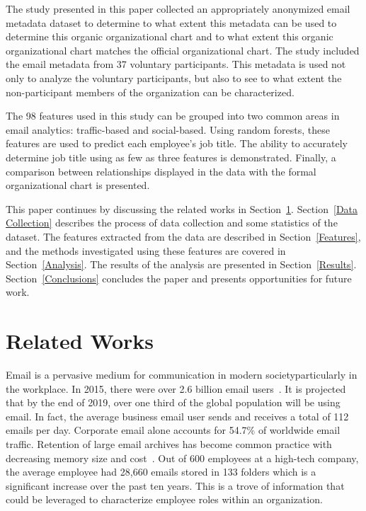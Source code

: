 \documentclass{article}
\begin{document}
The study presented in this paper collected an appropriately anonymized email metadata dataset to determine to what extent this metadata can be used to determine this organic organizational chart and to what extent this organic organizational chart matches the official organizational chart.  The study included the email metadata from 37 voluntary participants.  This metadata is used not only to analyze the voluntary participants, but also to see to what extent the non-participant members of the organization can be characterized.

The 98 features used in this study can be grouped into two common areas in email analytics: traffic-based and social-based. Using random forests, these features are used to predict each employee's job title.  The ability to accurately determine job title using as few as three features is demonstrated.  Finally, a comparison between relationships displayed in the data with the formal organizational chart is presented.  

This paper continues by discussing the related works in Section~\ref{Related Works}.  Section~\ref{Data Collection} describes the process of data collection and some statistics of the dataset.  The features extracted from the data are described in Section~\ref{Features}, and the methods investigated using these features are covered in Section~\ref{Analysis}.  The results of the analysis are presented in Section~\ref{Results}.  Section~\ref{Conclusions} concludes the paper and presents opportunities for future work.  

\section{Related Works} \label{Related Works}

Email is a pervasive medium for communication in modern society\textemdash{}particularly in the workplace.  In 2015, there were over 2.6 billion email users~\cite{radicati_emails_2015}.  It is projected that by the end of 2019, over one third of the global population will be using email.  In fact, the average business email user sends and receives a total of 112 emails per day.  Corporate email alone accounts for 54.7\% of worldwide email traffic. Retention of large email archives has become common practice with decreasing memory size and cost~\cite{fisher_revisiting_2006}.  Out of 600 employees at a high-tech company, the average employee had 28,660 emails stored in 133 folders which is a significant increase over the past ten years.  This is a trove of information that could be leveraged to characterize employee roles within an organization.
\end{document}
